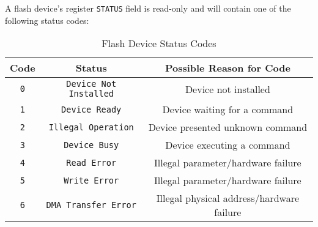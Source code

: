 \documentclass[12pt,a4paper,openright,twoside]{report}
\begin{document}
	A flash device's register \texttt{STATUS} field is read-only and will contain one of the following status codes:
	\begin{table}[h]
	\centering
	\begin{tabular}{c|c|c}
	Code & Status & Possible Reason for Code \\  \hline\hline
	\texttt{0} & \texttt{Device Not Installed} & Device not installed \\ \hline
	\texttt{1} & \texttt{Device Ready} & Device waiting for a command \\ \hline
	\texttt{2} & \texttt{Illegal Operation} & Device presented unknown command \\ \hline
	\texttt{3} & \texttt{Device Busy} & Device executing a command \\ \hline
	\texttt{4} & \texttt{Read Error} & Illegal parameter/hardware failure \\ \hline
	\texttt{5} & \texttt{Write Error} & Illegal parameter/hardware failure \\ \hline
	\texttt{6} & \texttt{DMA Transfer Error} & Illegal physical address/hardware failure
	\end{tabular}
	\caption{Flash Device Status Codes}
	\end{table}
	
\end{document}
